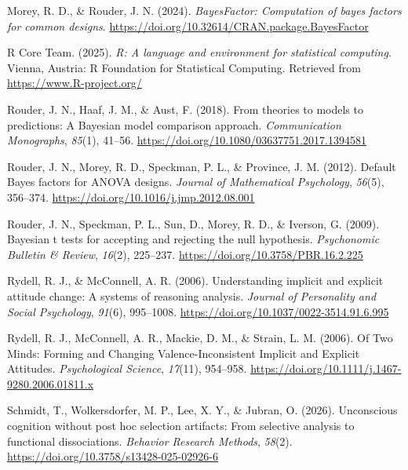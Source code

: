\documentclass[
  man,floatsintext]{apa6}
\newlength{\cslhangindent}
\newlength{\cslentryspacingunit} %
\newenvironment{CSLReferences}[2] %
 {%
  \setlength{\parindent}{0pt}
  \ifodd #1
  \let\oldpar\par
  \def\par{\hangindent=\cslhangindent\oldpar}
  \fi
  \setlength{\parskip}{#2\cslentryspacingunit}
 }%
 {}
\begin{document}
\begin{CSLReferences}{1}{0}
\leavevmode{}%
Morey, R. D., \& Rouder, J. N. (2024). \emph{BayesFactor: Computation of bayes factors for common designs}. \url{https://doi.org/10.32614/CRAN.package.BayesFactor}

\leavevmode{}%
R Core Team. (2025). \emph{R: A language and environment for statistical computing}. Vienna, Austria: R Foundation for Statistical Computing. Retrieved from \url{https://www.R-project.org/}

\leavevmode{}%
Rouder, J. N., Haaf, J. M., \& Aust, F. (2018). From theories to models to predictions: {A Bayesian} model comparison approach. \emph{Communication Monographs}, \emph{85}(1), 41--56. \url{https://doi.org/10.1080/03637751.2017.1394581}

\leavevmode{}%
Rouder, J. N., Morey, R. D., Speckman, P. L., \& Province, J. M. (2012). Default {Bayes} factors for {ANOVA} designs. \emph{Journal of Mathematical Psychology}, \emph{56}(5), 356--374. \url{https://doi.org/10.1016/j.jmp.2012.08.001}

\leavevmode{}%
Rouder, J. N., Speckman, P. L., Sun, D., Morey, R. D., \& Iverson, G. (2009). Bayesian t tests for accepting and rejecting the null hypothesis. \emph{Psychonomic Bulletin \& Review}, \emph{16}(2), 225--237. \url{https://doi.org/10.3758/PBR.16.2.225}

\leavevmode{}%
Rydell, R. J., \& McConnell, A. R. (2006). Understanding implicit and explicit attitude change: {A} systems of reasoning analysis. \emph{Journal of Personality and Social Psychology}, \emph{91}(6), 995--1008. \url{https://doi.org/10.1037/0022-3514.91.6.995}

\leavevmode{}%
Rydell, R. J., McConnell, A. R., Mackie, D. M., \& Strain, L. M. (2006). Of {Two Minds}: {Forming} and {Changing Valence}-{Inconsistent Implicit} and {Explicit Attitudes}. \emph{Psychological Science}, \emph{17}(11), 954--958. \url{https://doi.org/10.1111/j.1467-9280.2006.01811.x}

\leavevmode{}%
Schmidt, T., Wolkersdorfer, M. P., Lee, X. Y., \& Jubran, O. (2026). Unconscious cognition without post hoc selection artifacts: From selective analysis to functional dissociations. \emph{Behavior Research Methods}, \emph{58}(2). \url{https://doi.org/10.3758/s13428-025-02926-6}


\end{CSLReferences}
\end{document}

